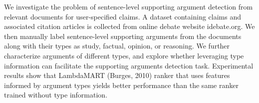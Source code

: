 We investigate the problem of sentence-level supporting argument detection from relevant documents for user-specified claims. A dataset containing claims and associated citation articles is collected from online debate website idebate.org. We then manually label sentence-level supporting arguments from the documents along with their types as study, factual, opinion, or reasoning. We further characterize arguments of different types, and explore whether leveraging type information can facilitate the supporting arguments detection task. Experimental results show that LambdaMART (Burges, 2010) ranker that uses features informed by argument types yields better performance than the same ranker trained without type information.
